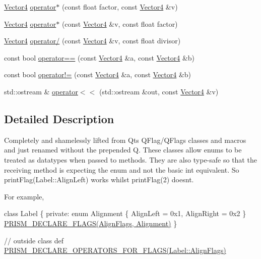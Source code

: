 \begin{DoxyCompactItemize}
\item 
\hyperlink{classprism_1_1_vector4}{Vector4} \hyperlink{namespaceprism_aa652a61fe96302693aa0279e832360c7}{operator$\ast$} (const float factor, const \hyperlink{classprism_1_1_vector4}{Vector4} \&v)
\item 
\hyperlink{classprism_1_1_vector4}{Vector4} \hyperlink{namespaceprism_ab3b4a59d9247143b49db3c2778838895}{operator$\ast$} (const \hyperlink{classprism_1_1_vector4}{Vector4} \&v, const float factor)
\item 
\hyperlink{classprism_1_1_vector4}{Vector4} \hyperlink{namespaceprism_a4aa2b9a75c3d5134fc80cc6afc1be443}{operator/} (const \hyperlink{classprism_1_1_vector4}{Vector4} \&v, const float divisor)
\item 
const bool \hyperlink{namespaceprism_a80bdef743a64c754bf1a2b217c82f60a}{operator==} (const \hyperlink{classprism_1_1_vector4}{Vector4} \&a, const \hyperlink{classprism_1_1_vector4}{Vector4} \&b)
\item 
const bool \hyperlink{namespaceprism_a1ffa413af039c2bff07202dcfce55f05}{operator!=} (const \hyperlink{classprism_1_1_vector4}{Vector4} \&a, const \hyperlink{classprism_1_1_vector4}{Vector4} \&b)
\item 
std\+::ostream \& \hyperlink{namespaceprism_aeb86919d9ba71747d21fbd6e28671692}{operator$<$$<$} (std\+::ostream \&out, const \hyperlink{classprism_1_1_vector4}{Vector4} \&v)
\end{DoxyCompactItemize}


\subsection{Detailed Description}
Completely and shamelessly lifted from Qt\textquotesingle{}s Q\+Flag/\+Q\+Flags classes and macros and just renamed without the prepended \textquotesingle{}Q\textquotesingle{}. These classes allow enums to be treated as datatypes when passed to methods. They are also type-\/safe so that the receiving method is expecting the enum and not the basic int equivalent. So print\+Flag(\+Label\+::\+Align\+Left) works whilst print\+Flag(2) doesn\textquotesingle{}t.

For example,

class Label \{ private\+: enum Alignment \{ Align\+Left = 0x1, Align\+Right = 0x2 \} \hyperlink{_flags_8h_aa5aa2c9827ab949836e20999b9a068ec}{P\+R\+I\+S\+M\+\_\+\+D\+E\+C\+L\+A\+R\+E\+\_\+\+F\+L\+A\+G\+S(\+Align\+Flags, Alignment)} \}

// outside class def \hyperlink{_flags_8h_ae8aabb683a18b872a4449769b82e8e15}{P\+R\+I\+S\+M\+\_\+\+D\+E\+C\+L\+A\+R\+E\+\_\+\+O\+P\+E\+R\+A\+T\+O\+R\+S\+\_\+\+F\+O\+R\+\_\+\+F\+L\+A\+G\+S(\+Label\+::\+Align\+Flags)}

